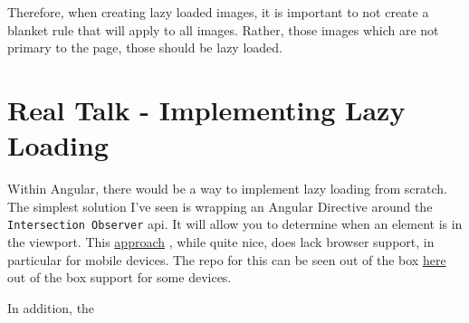 Therefore, when creating lazy loaded images, it is important to not create a 
blanket rule that will apply to all images. Rather, those images which are not 
primary to the page, those should be lazy loaded. 

\section{ Real Talk - Implementing Lazy Loading }
Within Angular, there would be a way to implement lazy loading from scratch. 
The simplest solution I've seen is wrapping an Angular Directive around the 
\lstinline{Intersection Observer} api. It will allow you to determine when 
an element is in the viewport. 
This \href{https://blog.angularindepth.com/a-modern-solution-to-lazy-loading-using-intersection-observer-9280c149bbc}{approach}
, while quite nice, does lack browser support, in particular for mobile devices. 
The repo for this can be seen out of the box \href{https://github.com/TradeMe/ng-defer-load}{here}
out of the box support for some devices. 

In addition, the 
